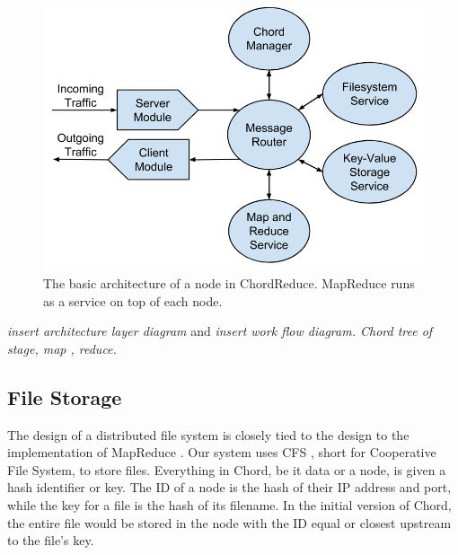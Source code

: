\begin{figure}
    \includegraphics[width=\linewidth]{crArch}
    \caption{The basic architecture of a node in ChordReduce.  MapReduce runs as a service on top of each node.}
    \label{crArch}
\end{figure}




\textit{insert architecture layer diagram }  and \textit{insert work flow diagram.  Chord tree of stage, map , reduce.}




\subsection{File Storage}
The design of a distributed file system is closely tied to the design to the implementation of MapReduce \cite{gfs} \cite{hdfs}.  Our system uses CFS \cite{CFS}, short for Cooperative File System, to store files.  Everything in Chord, be it data or a node, is given a hash identifier or key. The ID of a node is the hash of their IP address and port, while the key for a file is the hash of its filename.  In the initial version of Chord, the entire file would be stored in the node with the ID equal or closest upstream to the file's key.

